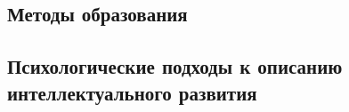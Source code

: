 

\subsection{Методы образования}



\subsection{Психологические подходы к описанию интеллектуального развития}

